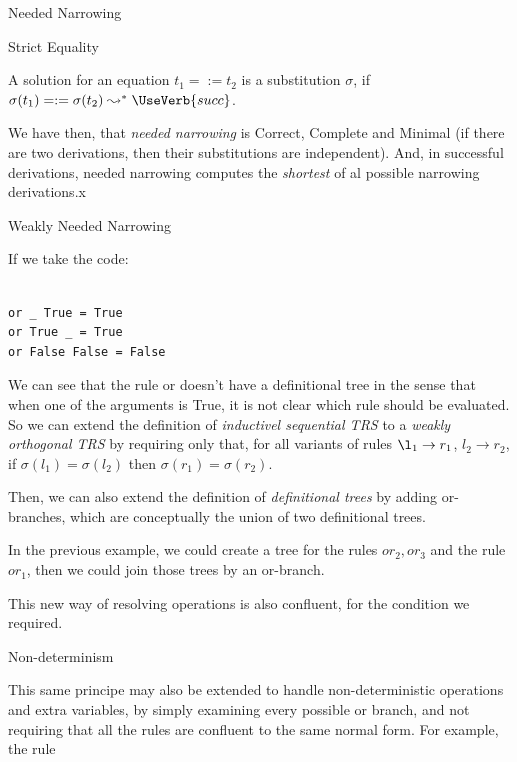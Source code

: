 \documentclass{beamer}
\begin{document}
\begin{section}{Needed Narrowing}
\begin{subsection}{Strict Equality}
\begin{frame}[fragile]

A solution for an equation $t_1 =:= t_2$ is a substitution $\sigma$, if $\sigma(t_1) =:= \sigma(t_2) \leadsto^* \UseVerb{succ}$.

We have then, that \textit{needed narrowing} is Correct, Complete and Minimal (if there are two derivations, then their substitutions are independent). And, in successful derivations, needed narrowing computes the \textit{shortest} of al possible narrowing derivations.x

\end{frame}
\end{subsection}

\begin{subsection}{Weakly Needed Narrowing}

\begin{frame}[fragile]

  If we take the code:
\begin{verbatim}

or _ True = True
or True _ = True
or False False = False

\end{verbatim}

  We can see that the rule or doesn't have a definitional tree in the sense that when one of the arguments is True, it is not clear which rule should be evaluated. So we can extend the definition of \textit{inductivel sequential TRS} to a \textit{weakly orthogonal TRS} by requiring only that, for all variants of rules $\l_1 \rightarrow r_1$, $l_2 \rightarrow r_2$, if $\sigma(l_1) = \sigma(l_2)$ then $\sigma(r_1) = \sigma(r_2)$.

\end{frame}

\begin{frame}
  Then, we can also extend the definition of \textit{definitional trees} by adding or-branches, which are conceptually the union of two definitional trees.

  In the previous example, we could create a tree for the rules {$or_2,or_3$} and the rule {$or_1$}, then we could join those trees by an or-branch.

  This new way of resolving operations is also confluent, for the condition we required.

  \end{frame}
\end{subsection}

\begin{subsection}{Non-determinism}
\begin{frame}[fragile]
  This same principe may also be extended to handle non-deterministic operations and extra variables, by simply examining every possible or branch, and not requiring that all the rules are confluent to the same normal form. For example, the rule


\end{frame}
\end{subsection}
\end{section}
\end{document}
